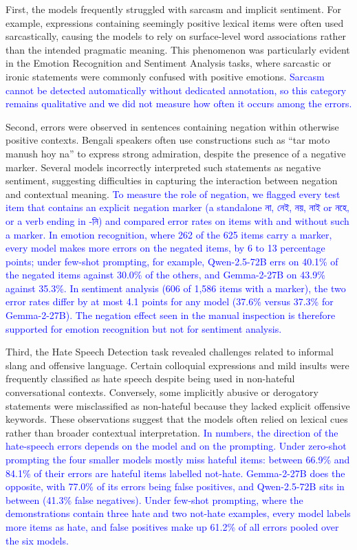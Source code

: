 \documentclass[10pt,letterpaper]{article}
\newcommand{\banglaNegationExample}{tar moto manush hoy na}
\newcommand{\banglaNegationExample}{{\bengalifont তার মতো মানুষ হয় না}}
\newcommand{\rev}[1]{\textcolor{blue}{#1}}
\begin{document}
First, the models frequently struggled with sarcasm and implicit sentiment. For example, expressions containing seemingly positive lexical items were often used sarcastically, causing the models to rely on surface-level word associations rather than the intended pragmatic meaning. This phenomenon was particularly evident in the Emotion Recognition and Sentiment Analysis tasks, where sarcastic or ironic statements were commonly confused with positive emotions. \rev{Sarcasm cannot be detected automatically without dedicated annotation, so this category remains qualitative and we did not measure how often it occurs among the errors.}

Second, errors were observed in sentences containing negation within otherwise positive contexts. Bengali speakers often use constructions such as ``\banglaNegationExample'' to express strong admiration, despite the presence of a negative marker. Several models incorrectly interpreted such statements as negative sentiment, suggesting difficulties in capturing the interaction between negation and contextual meaning. \rev{To measure the role of negation, we flagged every test item that contains an explicit negation marker (a standalone না, নেই, নয়, নাই or নহে, or a verb ending in -নি) and compared error rates on items with and without such a marker. In emotion recognition, where 262 of the 625 items carry a marker, every model makes more errors on the negated items, by 6 to 13 percentage points; under few-shot prompting, for example, Qwen-2.5-72B errs on 40.1\% of the negated items against 30.0\% of the others, and Gemma-2-27B on 43.9\% against 35.3\%. In sentiment analysis (606 of 1,586 items with a marker), the two error rates differ by at most 4.1 points for any model (37.6\% versus 37.3\% for Gemma-2-27B). The negation effect seen in the manual inspection is therefore supported for emotion recognition but not for sentiment analysis.}

Third, the Hate Speech Detection task revealed challenges related to informal slang and offensive language. Certain colloquial expressions and mild insults were frequently classified as hate speech despite being used in non-hateful conversational contexts. Conversely, some implicitly abusive or derogatory statements were misclassified as non-hateful because they lacked explicit offensive keywords. These observations suggest that the models often relied on lexical cues rather than broader contextual interpretation. \rev{In numbers, the direction of the hate-speech errors depends on the model and on the prompting. Under zero-shot prompting the four smaller models mostly miss hateful items: between 66.9\% and 84.1\% of their errors are hateful items labelled not-hate. Gemma-2-27B does the opposite, with 77.0\% of its errors being false positives, and Qwen-2.5-72B sits in between (41.3\% false negatives). Under few-shot prompting, where the demonstrations contain three hate and two not-hate examples, every model labels more items as hate, and false positives make up 61.2\% of all errors pooled over the six models.}
\end{document}
